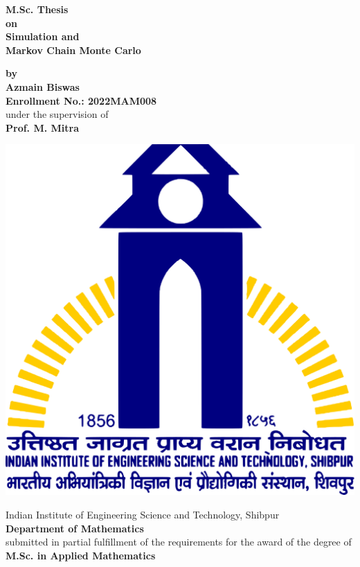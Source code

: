 \begin{titlepage}
    \begin{center}


        \Large{\textbf{M.Sc. Thesis\\ on}}\\
        \huge{\textbf{Simulation and \\ Markov Chain Monte Carlo}}

        \vspace{0.2cm}
        \large{\textbf{by}}\\ 
        \Large{\textbf{Azmain Biswas}}\\ 
        \Large{\textbf{Enrollment No.: 2022MAM008}}\\ 
        \Large{under the supervision of}\\ 
        \Large{\textbf{Prof. M. Mitra}}

        \vspace{1cm}

        \includegraphics[scale = 0.1]{images/IIEST_Shibpur_Logo.svg.png}

        \vspace{0.2cm}

        \Large{{
                Indian Institute of Engineering Science and Technology, Shibpur\\ 
                \textbf{Department of Mathematics}
        }}\\
        \vspace*{0.5cm}
        \large{{submitted in partial fulfillment of the requirements for the award of the degree of}}\\
        \Large{\textbf{M.Sc. in Applied Mathematics}}
    \end{center}
\end{titlepage}
